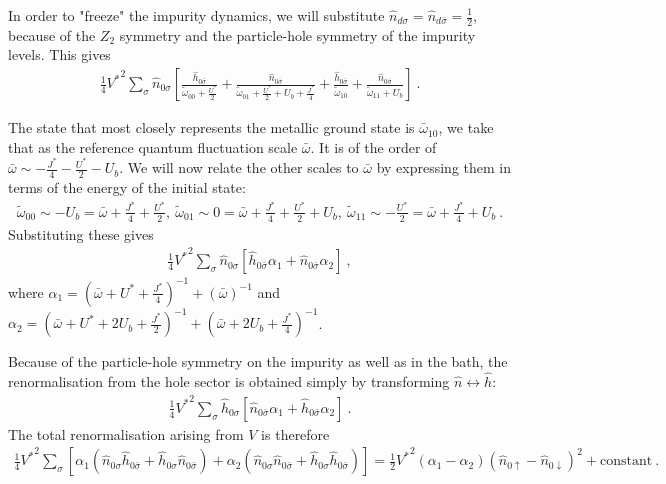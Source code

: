 \documentclass{iopart}
\begin{document}
In order to "freeze" the impurity dynamics, we will substitute \(\hat n_{d\sigma} = \hat n_{d\bar\sigma} = \frac{1}{2}\), because of the \({Z}_2\) symmetry and the particle-hole symmetry of the impurity levels. This gives
\begin{eqnarray}
	\frac{1}{4}{V^*}^2 \sum_\sigma \hat n_{0\sigma} \left[\frac{\hat h_{0\bar\sigma}}{\tilde\omega_{00} + \frac{U^*}{2}} + \frac{\hat n_{0\bar\sigma}}{\tilde\omega_{01} + \frac{U^*}{2} + U_b + \frac{J^*}{4}} + \frac{\hat h_{0\bar\sigma}}{\tilde\omega_{10}} + \frac{\hat n_{0\bar\sigma}}{\tilde\omega_{11} + U_b}\right]~.
\end{eqnarray}

The state that most closely represents the metallic ground state is \(\bar \omega_{10}\), we take that as the reference quantum fluctuation scale \(\bar\omega\). It is of the order of \(\bar\omega \sim -\frac{J^*}{4} - \frac{U^*}{2} - U_b\). We will now relate the other scales to \(\bar\omega\) by expressing them in terms of the energy of the initial state:
\begin{eqnarray}
	\tilde\omega_{00} \sim -U_b = \bar\omega + \frac{J^*}{4} + \frac{U^*}{2}, ~\tilde\omega_{01} \sim 0 = \bar\omega + \frac{J^*}{4} + \frac{U^*}{2} + U_b, ~\tilde\omega_{11} \sim -\frac{U^*}{2} = \bar\omega + \frac{J^*}{4} + U_b~.
\end{eqnarray}
Substituting these gives
\begin{eqnarray}
	\frac{1}{4}{V^*}^2 \sum_\sigma \hat n_{0\sigma} \left[\hat h_{0\bar\sigma}\alpha_1 + \hat n_{0\bar\sigma}\alpha_2\right]~,
\end{eqnarray}
where \(\alpha_1 = \left(\bar\omega + U^* + \frac{J^*}{4}\right)^{-1} + \left(\bar\omega\right)^{-1}\) and \(\alpha_2 = \left(\bar\omega + U^* + 2U_b + \frac{J^*}{2}\right)^{-1} + \left(\bar\omega + 2U_b + \frac{J^*}{4}\right)^{-1}\).

Because of the particle-hole symmetry on the impurity as well as in the bath, the renormalisation from the hole sector is obtained simply by transforming \(\hat n \leftrightarrow \hat h\):
\begin{eqnarray}
	\frac{1}{4}{V^*}^2 \sum_\sigma \hat h_{0\sigma} \left[\hat n_{0\bar\sigma}\alpha_1 + \hat h_{0\bar\sigma}\alpha_2\right]~.
\end{eqnarray}
The total renormalisation arising from \(V\) is therefore 
\begin{eqnarray}
	\frac{1}{4}{V^*}^2 \sum_\sigma \left[\alpha_1 \left( \hat n_{0\sigma}\hat h_{0\bar\sigma} + \hat h_{0\sigma}\hat n_{0\bar\sigma}\right) + \alpha_2 \left( \hat n_{0\sigma}\hat n_{0\bar\sigma} + \hat h_{0\sigma}\hat h_{0\bar\sigma}\right)\right] = \frac{1}{2}{V^*}^2 \left(\alpha_1 - \alpha_2\right) \left(\hat n_{0 \uparrow} - \hat n_{0 \downarrow}\right)^2 + \text{constant}~.\qquad
\end{eqnarray}
\end{document}
